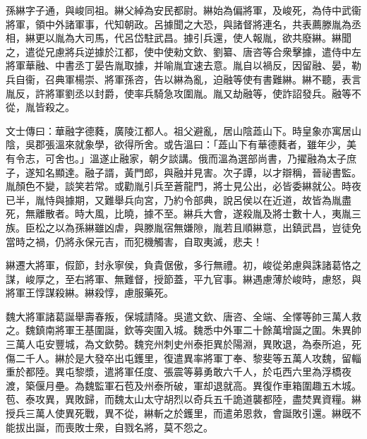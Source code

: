 
\begin{pinyinscope}
孫綝字子通，與峻同祖。綝父綽為安民都尉。綝始為偏將軍，及峻死，為侍中武衞將軍，領中外諸軍事，代知朝政。呂據聞之大恐，與諸督將連名，共表薦滕胤為丞相，綝更以胤為大司馬，代呂岱駐武昌。據引兵還，使人報胤，欲共廢綝。綝聞之，遣從兄慮將兵逆據於江都，使中使勑文欽、劉纂、唐咨等合衆擊據，遣侍中左將軍華融、中書丞丁晏告胤取據，并喻胤宜速去意。胤自以禍反，因留融、晏，勒兵自衞，召典軍楊崇、將軍孫咨，告以綝為亂，迫融等使有書難綝。綝不聽，表言胤反，許將軍劉丞以封爵，使率兵騎急攻圍胤。胤又劫融等，使詐詔發兵。融等不從，胤皆殺之。

文士傳曰：華融字德蕤，廣陵江都人。祖父避亂，居山陰蕋山下。時皇象亦寓居山陰，吳郡張溫來就象學，欲得所舍。或告溫曰：「蕋山下有華德蕤者，雖年少，美有令志，可舍也。」溫遂止融家，朝夕談講。俄而溫為選部尚書，乃擢融為太子庶子，遂知名顯達。融子諝，黃門郎，與融并見害。次子譚，以才辯稱，晉祕書監。胤顏色不變，談笑若常。或勸胤引兵至蒼龍門，將士見公出，必皆委綝就公。時夜已半，胤恃與據期，又難舉兵向宮，乃約令部典，說呂侯以在近道，故皆為胤盡死，無離散者。時大風，比曉，據不至。綝兵大會，遂殺胤及將士數十人，夷胤三族。臣松之以為孫綝雖凶虐，與滕胤宿無嫌隙，胤若且順綝意，出鎮武昌，豈徒免當時之禍，仍將永保元吉，而犯機觸害，自取夷滅，悲夫！

綝遷大將軍，假節，封永寧侯，負貴倨傲，多行無禮。初，峻從弟慮與誅諸葛恪之謀，峻厚之，至右將軍、無難督，授節蓋，平九官事。綝遇慮薄於峻時，慮怒，與將軍王惇謀殺綝。綝殺惇，慮服藥死。

魏大將軍諸葛誕舉壽春叛，保城請降。吳遣文欽、唐咨、全端、全懌等帥三萬人救之。魏鎮南將軍王基圍誕，欽等突圍入城。魏悉中外軍二十餘萬增誕之圍。朱異帥三萬人屯安豐城，為文欽勢。魏兖州刺史州泰拒異於陽淵，異敗退，為泰所追，死傷二千人。綝於是大發卒出屯鑊里，復遣異率將軍丁奉、黎斐等五萬人攻魏，留輜重於都陸。異屯黎漿，遣將軍任度、張震等募勇敢六千人，於屯西六里為浮橋夜渡，築偃月壘。為魏監軍石苞及州泰所破，軍却退就高。異復作車箱圍趣五木城。苞、泰攻異，異敗歸，而魏太山太守胡烈以奇兵五千詭道襲都陸，盡焚異資糧。綝授兵三萬人使異死戰，異不從，綝斬之於鑊里，而遣弟恩救，會誕敗引還。綝旣不能拔出誕，而喪敗士衆，自戮名將，莫不怨之。


\end{pinyinscope}
